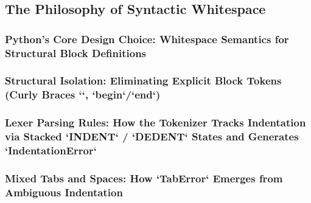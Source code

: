 \subsection{The Philosophy of Syntactic Whitespace}
\subsubsection{Python’s Core Design Choice: Whitespace Semantics for Structural Block Definitions}
\subsubsection{Structural Isolation: Eliminating Explicit Block Tokens (Curly Braces `{}`, `begin`/`end`)}
\subsubsection{Lexer Parsing Rules: How the Tokenizer Tracks Indentation via Stacked `INDENT` / `DEDENT` States and Generates `IndentationError`}
\subsubsection{Mixed Tabs and Spaces: How `TabError` Emerges from Ambiguous Indentation}
